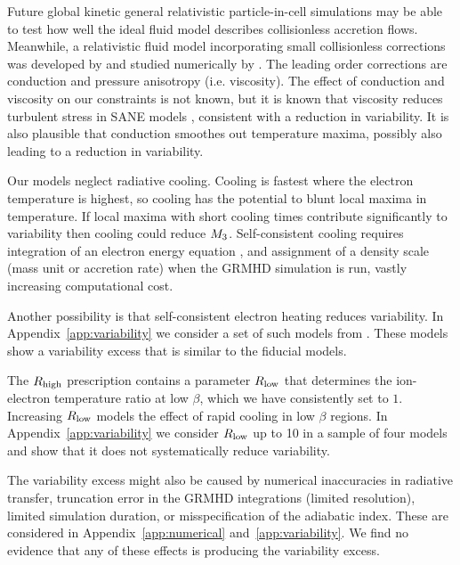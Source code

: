 Future global kinetic general relativistic particle-in-cell simulations may be able to test how well the ideal fluid model describes collisionless accretion flows.
Meanwhile, a relativistic fluid model incorporating small collisionless corrections was developed by \citet{2015ApJ...810..162C} and studied numerically by \citet{2017MNRAS.470.2240F}.
The leading order corrections are conduction and pressure anisotropy (i.e. viscosity).
The effect of conduction and viscosity on our constraints is not known, but it is known that viscosity reduces turbulent stress in SANE models \citep{2017MNRAS.470.2240F}, consistent with a reduction in variability.
It is also plausible that conduction smoothes out temperature maxima, possibly also leading to a reduction in variability.

Our models neglect radiative cooling.
Cooling is fastest where the electron temperature is highest, so cooling has the potential to blunt  local maxima in temperature.
If local maxima with short cooling times contribute significantly to variability then cooling could reduce $M_{3}$.
Self-consistent cooling requires integration of an electron energy equation \citep[e.g.][]{2015MNRAS.454.1848R}, and assignment of a density scale (mass unit or accretion rate) when the GRMHD simulation is run, vastly increasing computational cost.

Another possibility is that self-consistent electron heating reduces variability.
In Appendix~\ref{app:variability} we consider a set of such models from \citet{2020MNRAS.494.4168D}.
These models show a variability excess that is similar to the fiducial models.

The $R_\mathrm{high}$ prescription contains a parameter $R_\mathrm{low}$ that determines the ion-electron temperature ratio at low $\beta$, which we have consistently set to $1$.
Increasing $R_\mathrm{low}$ models the effect of rapid cooling in low $\beta$ regions.
In Appendix~\ref{app:variability} we consider $R_\mathrm{low}$ up to 10 in a sample of four models and show that it does not systematically reduce variability.

The variability excess might also be caused by numerical inaccuracies in radiative transfer, truncation error in the GRMHD integrations (limited resolution), limited simulation duration, or misspecification of the adiabatic index.
These are considered in Appendix~\ref{app:numerical} and~\ref{app:variability}.
We find no evidence that any of these effects is producing the variability excess.

